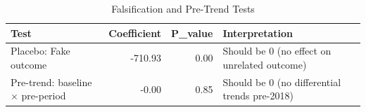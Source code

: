 \begin{table}[ht]
\centering
\begin{tabular}{lrrl}
  \hline
Test & Coefficient & P\_value & Interpretation \\ 
  \hline
Placebo: Fake outcome & -710.93 & 0.00 & Should be 0 (no effect on unrelated outcome) \\ 
  Pre-trend: baseline × pre-period & -0.00 & 0.85 & Should be 0 (no differential trends pre-2018) \\ 
   \hline
\end{tabular}
\caption{Falsification and Pre-Trend Tests} 
\label{tab:falsification}
\end{table}
